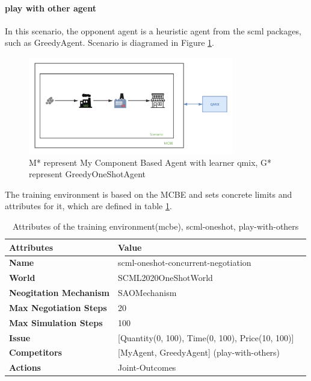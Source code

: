 \paragraph{play with other agent} In this scenario, the opponent agent is a heuristic agent from the scml packages, such as GreedyAgent.
Scenario is diagramed in Figure \ref{fig:scenario-oneshot-scml-play-with-greedy}.
\begin{figure}[htbp]
\centering
\includegraphics[width=0.80\textwidth]{./images/scenario-oneshot-scml-play-with-greedy.png}
\caption{M* represent My Component Based Agent with learner \gls{qmix}, G* represent GreedyOneShotAgent}
\label{fig:scenario-oneshot-scml-play-with-greedy}
\end{figure}

The training environment is based on the MCBE and sets concrete limits and attributes for it,
which are defined in table \ref{tab:attributes-mcbe-concurrent-negotiation-scml-oneshot-with-others}.

\begin{table}[htbp]
\centering
\begin{tabular}{l l l} \toprule
\bfseries \textbf{Attributes}    & \bfseries \textbf{Value}                                             \\ \midrule
\textbf{Name}                    & scml-oneshot-concurrent-negotiation                                  \\
\textbf{World}                   & SCML2020OneShotWorld                                                 \\
\textbf{Neogitation Mechanism}   & SAOMechanism                                                         \\
\textbf{Max Negotiation Steps}   & 20                                                                  \\
\textbf{Max Simulation Steps}    & 100                                                                   \\
\textbf{Issue}             	     & [Quantity(0, 100), Time(0, 100), Price(10, 100)]                     \\
\textbf{Competitors}             & [MyAgent, GreedyAgent] (play-with-others)                                       \\
\textbf{Actions}                 & Joint-Outcomes                                                             \\
\bottomrule
\end{tabular}
\caption{Attributes of the training environment(mcbe), scml-oneshot, play-with-others}
\label{tab:attributes-mcbe-concurrent-negotiation-scml-oneshot-with-others}
\end{table}

